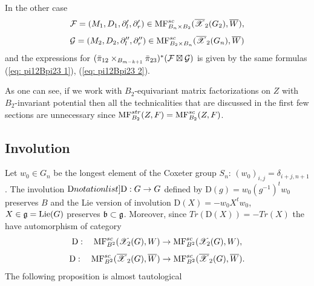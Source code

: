 In the other case  \[\mathcal{F}=(M_1,D_1,\partial'_l,\partial'_r)\in \mathrm{MF}^{sc}_{B_n\times B_2}(\overline{\mathscr{X}}_2(G_2),\overline{W}),\]
\[ \mathcal{G}=(M_2,D_2,\partial''_l,\partial''_r)\in \mathrm{MF}^{sc}_{B_2\times B_n}(\overline{\mathscr{X}}_2(G_n),\overline{W})\] and the expressions for
$(\bar{\pi}_{12}\times_{B_{m-k+1}}\bar{\pi}_{23})^*(\mathcal{F}\boxtimes \mathcal{G})$ is given by the same formulas (\ref{eq: pi12Bpi23 1}), (\ref{eq: pi12Bpi23 2}).



\begin{remark} As one can see, if we work with $B_2$-equivariant matrix factorizations on $Z$ with $B_2$-invariant potential then all the technicalities that are discussed in the first few sections are
unnecessary since $\mathrm{MF}_{B_2}^{str}(Z,F)=\mathrm{MF}^{sc}_{B_2}(Z,F)$.
\end{remark}

\subsection{Involution} Let $w_0\in G_n$ be the longest element of the Coxeter group $S_n$: $(w_0)_{i,j}=\delta_{i+j,n+1}$.   The involution $\SymbolPrint{\mathrm{D}}: G\to G$ defined by
$\mathrm{D}(g)=w_0 (g^{-1})^t w_0$ preserves $B$ and the Lie version of involution $\mathrm{D}(X)=-w_0 X^t w_0$, \(X\in \mathfrak{g}=\textup{Lie}(G)\) preserves $\mathfrak{b}\subset \mathfrak{g}$. Moreover, since $Tr(\mathrm{D}(X))=-Tr(X)$ the
have automorphism of category \[\mathrm{D}:\quad \mathrm{MF}^{sc}_{B^2}(\mathscr{X}_2(G),W)\to \mathrm{MF}^{sc}_{B^2}(\mathscr{X}_2(G),W),\]
\[ \mathrm{D}:\quad \mathrm{MF}^{sc}_{B^2}(\overline{\mathscr{X}}_2(G),\overline{W})\to \mathrm{MF}^{sc}_{B^2}(\overline{\mathscr{X}}_2(G),\overline{W}).\]
The following proposition is almost tautological

